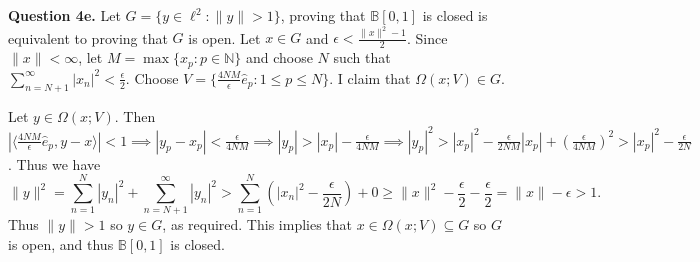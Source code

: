 \documentclass[letterpaper, reqno,11pt]{article}
\begin{document}
{\medskip\noindent\bf Question 4e.} Let $G=\{y\in \ell^2:\|y\|>1\}$, proving that $\mathbb B[0,1]$ is closed is equivalent to proving that $G$ is open. Let $x\in G$ and $\epsilon<\frac{\|x\|^2-1}{2}$. Since $\|x\|<\infty$, let $M=\max \{x_p: p\in \mathbb{N}\}$ and choose $N$ such that $\sum_{n=N+1}^{\infty}|x_n|^2<\frac{\epsilon}{2}$. Choose $V=\{\frac{4NM}{\epsilon}\hat e_p: 1\leq p\leq N\}$. I claim that $\Omega(x;V)\in G$.

Let $y\in \Omega(x;V)$. Then $\left|\langle \frac{4NM}{\epsilon}\hat e_p,y-x\rangle\right|<1\implies |y_p-x_p|<\frac{\epsilon}{4NM}\implies |y_p|>|x_p|-\frac{\epsilon}{4NM}\implies|y_p|^2>|x_p|^2-\frac{\epsilon}{2NM}|x_p|+\left( \frac{\epsilon}{4NM} \right)^2>|x_p|^2-\frac{\epsilon}{2N}$. Thus we have
\[
\|y\|^2=\sum_{n=1}^{N}|y_n|^2+\sum_{n=N+1}^{\infty}|y_n|^2>\sum_{n=1}^{N}\left(|x_n|^2-\frac{\epsilon}{2N}\right)+0\geq \|x\|^2-\frac{\epsilon}{2}-\frac{\epsilon}{2}=\|x\|-\epsilon>1
.\]
Thus $\|y\|>1$ so $y\in G$, as required. This implies that $x\in\Omega(x;V)\subseteq G$ so $G$ is open, and thus $\mathbb B[0,1]$ is closed.
\end{document}
